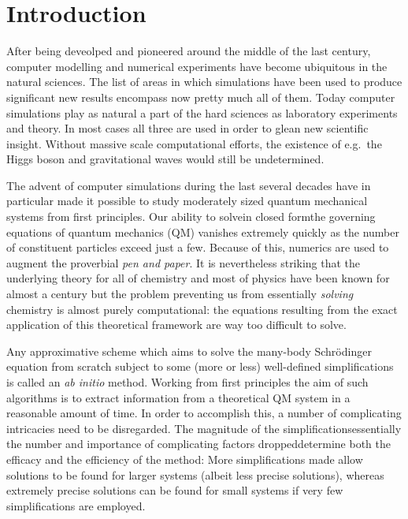 \documentclass[twoside,english]{uiofysmaster}
\begin{document}
\tableofcontents

\chapter{Introduction}
After being deveolped and pioneered around the middle of the last century, computer modelling and numerical experiments have become ubiquitous in the natural sciences. The list of areas in which simulations have been used to produce significant new results encompass now pretty much all of them. Today computer simulations play as natural a part of the hard sciences as laboratory experiments and theory. In most cases all three are used in order to glean new scientific insight. Without massive scale computational efforts, the existence of e.g.\ the Higgs boson and gravitational waves would still be undetermined.

The advent of computer simulations during the last several decades have in particular made it possible to study moderately sized quantum mechanical systems from first principles. Our ability to solve\textemdash in closed form\textemdash the governing equations of quantum mechanics (QM) vanishes extremely quickly as the number of constituent particles exceed just a few. Because of this, numerics are used to augment the proverbial \emph{pen and paper}. It is nevertheless striking that the underlying theory for all of chemistry and most of physics have been known for almost a century but the problem preventing us from essentially \emph{solving} chemistry is almost purely computational: the equations resulting from the exact application of this theoretical framework are way too difficult to solve.

Any approximative scheme which aims to solve the many-body Schrödinger equation from scratch subject to some (more or less) well-defined simplifications is called an \emph{ab initio} method. Working from first principles the aim of such algorithms is to extract information from a theoretical QM system in a reasonable amount of time. In order to accomplish this, a number of complicating intricacies need to be disregarded. The magnitude of the simplifications\textemdash essentially the number and importance of complicating factors dropped\textemdash determine both the efficacy and the efficiency of the method: More simplifications made allow solutions to be found for larger systems (albeit less precise solutions), whereas extremely precise solutions can be found for small systems if very few simplifications are employed.
\end{document}
